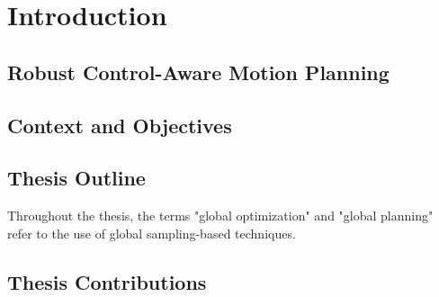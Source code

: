 \chapter{Introduction}

\section{Robust Control-Aware Motion Planning}

\section{Context and Objectives}

\section{Thesis Outline}

Throughout the thesis, the terms "global optimization" and "global planning" refer to the use of global sampling-based techniques.

\section{Thesis Contributions}

\todomarker{}